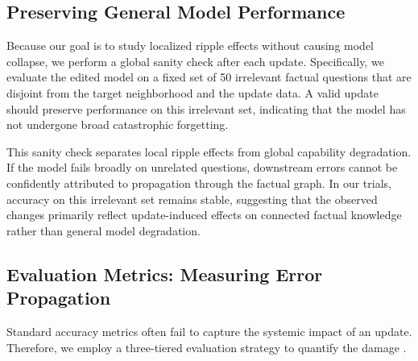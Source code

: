 \subsection{Preserving General Model Performance}

Because our goal is to study localized ripple effects without causing model collapse, we perform a global sanity check after each update. Specifically, we evaluate the edited model on a fixed set of 50 irrelevant factual questions that are disjoint from the target neighborhood and the update data. A valid update should preserve performance on this irrelevant set, indicating that the model has not undergone broad catastrophic forgetting.

This sanity check separates local ripple effects from global capability degradation. If the model fails broadly on unrelated questions, downstream errors cannot be confidently attributed to propagation through the factual graph. In our trials, accuracy on this irrelevant set remains stable, suggesting that the observed changes primarily reflect update-induced effects on connected factual knowledge rather than general model degradation.








\subsection{Evaluation Metrics: Measuring Error Propagation}
Standard accuracy metrics often fail to capture the systemic impact of an update. Therefore, we employ a three-tiered evaluation strategy to quantify the damage \cite{meng2022rome, cohen2023ripple}.


